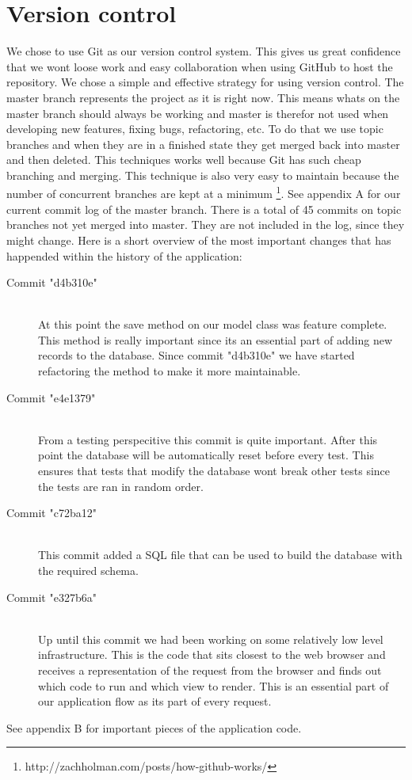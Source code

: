 \documentclass[12pt]{article}
\begin{document}
\section{Version control}
We chose to use Git as our version control system. This gives us great confidence that we wont loose work and easy collaboration when using GitHub to host the repository.
\newline
\newline
We chose a simple and effective strategy for using version control. The master branch represents the project as it is right now. This means whats on the master branch should always be working and master is therefor not used when developing new features, fixing bugs, refactoring, etc. To do that we use topic branches and when they are in a finished state they get merged back into master and then deleted. This techniques works well because Git has such cheap branching and merging. This technique is also very easy to maintain because the number of concurrent branches are kept at a minimum \footnote{http://zachholman.com/posts/how-github-works/}.
\newline
\newline
See appendix A for our current commit log of the master branch. There is a total of 45 commits on topic branches not yet merged into master. They are not included in the log, since they might change.
\newline
\newline
Here is a short overview of the most important changes that has happended within the history of the application:
\begin{description}
  \item[Commit "d4b310e"] \hfill \\
    At this point the save method on our model class was feature complete. This method is really important since its an essential part of adding new records to the database. Since commit "d4b310e" we have started refactoring the method to make it more maintainable.
  \item[Commit "e4e1379"] \hfill \\
    From a testing perspecitive this commit is quite important. After this point the database will be automatically reset before every test. This ensures that tests that modify the database wont break other tests since the tests are ran in random order.
  \item[Commit "c72ba12"] \hfill \\
    This commit added a SQL file that can be used to build the database with the required schema.
  \item[Commit "e327b6a"] \hfill \\
    Up until this commit we had been working on some relatively low level infrastructure. This is the code that sits closest to the web browser and receives a representation of the request from the browser and finds out which code to run and which view to render. This is an essential part of our application flow as its part of every request.
\end{description}
See appendix B for important pieces of the application code.
\end{document}
